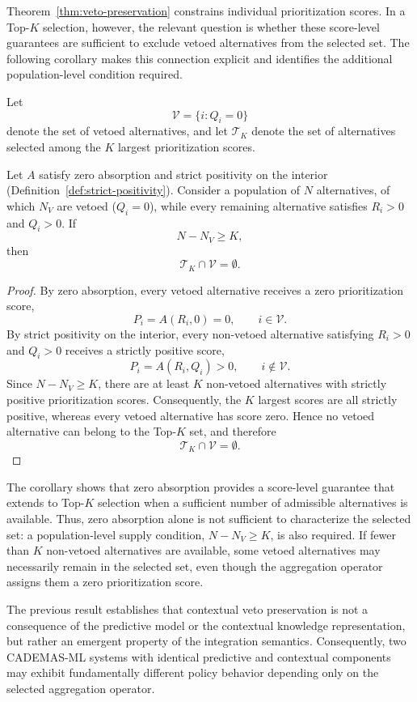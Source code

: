 \documentclass[mathematics,article,submit,moreauthors]{Definitions/mdpi}
\begin{document}
{\color{teal}Theorem~\ref{thm:veto-preservation} constrains individual
prioritization scores. In a Top-$K$ selection, however, the relevant
question is whether these score-level guarantees are sufficient to exclude
vetoed alternatives from the selected set. The following corollary makes
this connection explicit and identifies the additional population-level
condition required.

Let
\[
\mathcal{V}=\{i:Q_i=0\}
\]
denote the set of vetoed alternatives, and let $\mathcal{T}_K$ denote the
set of alternatives selected among the $K$ largest prioritization scores.

\begin{Corollary}
\label{cor:topk-exclusion}
Let $A$ satisfy zero absorption and strict positivity on the interior
(Definition~\ref{def:strict-positivity}). Consider a population of $N$
alternatives, of which $N_V$ are vetoed ($Q_i=0$), while every remaining
alternative satisfies $R_i>0$ and $Q_i>0$. If
\[
N-N_V\ge K,
\]
then
\[
\mathcal{T}_K\cap\mathcal{V}=\emptyset.
\]
\end{Corollary}

\begin{proof}
By zero absorption, every vetoed alternative receives a zero
prioritization score,
\[
P_i=A(R_i,0)=0,
\qquad i\in\mathcal{V}.
\]
By strict positivity on the interior, every non-vetoed alternative
satisfying $R_i>0$ and $Q_i>0$ receives a strictly positive score,
\[
P_i=A(R_i,Q_i)>0,
\qquad i\notin\mathcal{V}.
\]
Since $N-N_V\ge K$, there are at least $K$ non-vetoed alternatives with
strictly positive prioritization scores. Consequently, the $K$ largest
scores are all strictly positive, whereas every vetoed alternative has
score zero. Hence no vetoed alternative can belong to the Top-$K$ set,
and therefore
\[
\mathcal{T}_K\cap\mathcal{V}=\emptyset.
\]
\end{proof}

The corollary shows that zero absorption provides a score-level guarantee
that extends to Top-$K$ selection when a sufficient number of admissible
alternatives is available. Thus, zero absorption alone is not sufficient
to characterize the selected set: a population-level supply condition,
$N-N_V\ge K$, is also required. If fewer than $K$ non-vetoed alternatives
are available, some vetoed alternatives may necessarily remain in the
selected set, even though the aggregation operator assigns them a zero
prioritization score.}

The previous result establishes that contextual veto preservation is
not a consequence of the predictive model or the contextual knowledge
representation, but rather an emergent property of the integration
semantics. Consequently, two CADEMAS-ML systems with identical
predictive and contextual components may exhibit fundamentally different
policy behavior depending only on the selected aggregation operator.
\end{document}
